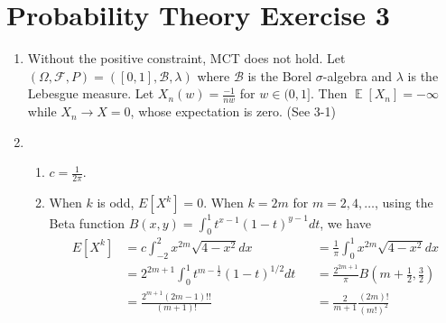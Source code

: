 \documentclass{article}
\DeclareMathOperator{\E}{\mathbb{E}}
\begin{document}
\section{Probability Theory Exercise 3}
\begin{enumerate}
    \item Without the positive constraint, MCT does not hold. Let $(\Omega, \mathcal{F}, P)=([0,1],
\mathcal{B}, \lambda)$ where $\mathcal{B}$ is the Borel $\sigma$-algebra
and $\lambda$ is the Lebesgue measure.
    Let $X_n(w) = \frac{-1}{nw}$ for $w\in (0,1]$. Then $\E[X_n]=-\infty$ while $X_n \to X=0$, whose expectation is zero. (See 3-1)
    \item 
\begin{enumerate}
    \item $c=\frac{1}{2\pi}$.
\item When $k$ is odd, $E[X^k]=0$. When $k=2m$ for $m=2,4,\dots$,
    using the Beta function $B(x, y)=\int_0^1 t^{x-1}(1-t)^{y-1} dt$,
we have
\begin{align*}
    E[X^k] &= c\int_{-2}^{2} x^{2m}\sqrt{4-x^2}dx 
    &&= \frac{1}{\pi} \int_0^1 x^{2m} \sqrt{4-x^2}dx \\
    &=2^{2m+1}\int_0^1 t^{m-\frac{1}{2}}(1-t)^{1/2} dt 
    &&=\frac{2^{2m+1}}{\pi}B(m+\frac{1}{2},\frac{3}{2}) \\
    &=\frac{2^{m+1}(2m-1)!!}{(m+1)!} &&=\frac{2}{m+1}\frac{(2m)!}{(m!)^2}
\end{align*}
\end{enumerate}    
    

\end{enumerate}
\end{document}

